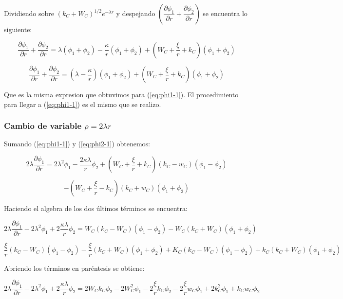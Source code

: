 \documentclass[a4paper, 12pt]{article} %
\begin{document}
Dividiendo sobre $(k_C + W_C)^{1/2}e^{-\lambda r}$ y despejando $\left( \dfrac{\partial \phi_1}{\partial r} 
+ \dfrac{\partial \phi_2}{\partial r} \right)$ se encuentra lo siguiente:

\[
\dfrac{\partial \phi_1}{\partial r} + \dfrac{\partial \phi_2}{\partial r} = \lambda (\phi_1 + \phi_2) - \dfrac{\kappa}{r}(\phi_1 + \phi_2)
+\left( W_C + \dfrac{\xi}{r} + k_C  \right)(\phi_1 + \phi_2) 
\]

\begin{equation}
\dfrac{\partial \phi_1}{\partial r} + \dfrac{\partial \phi_2}{\partial r} = \left ( \lambda - \dfrac{\kappa}{r} \right ) (\phi_1 + \phi_2)
+\left( W_C + \dfrac{\xi}{r} + k_C  \right)(\phi_1 + \phi_2) 
\end{equation}

Que es la misma expresion que obtuvimos para (\ref{eq:phi1-1}). El procedimiento para llegar a (\ref{eq:phi1-1}) es el mismo que se realizo.

 
\subsubsection{Cambio de variable $\rho=2\lambda r$} 

Sumando  (\ref{eq:phi1-1}) y  (\ref{eq:phi2-1}) obtenemos:

\[
2 \lambda \dfrac{\partial \phi_1}{\partial r} = 2 \lambda^2  \phi_1 
- \dfrac{2 \kappa \lambda }{r}\phi_2 + \left( W_C + \dfrac{\xi}{r} + k_C  \right ) 
(k_C - w_C)(\phi_1 - \phi_2) 
\]

\[
- \left( W_C + \dfrac{\xi}{r} - k_C  \right )(k_C + w_C)(\phi_1 + \phi_2) 
\]

Haciendo el algebra de los dos \'ultimos t\'erminos se encuentra:

\[
2 \lambda \dfrac{\partial \phi_1}{\partial r} -  2 \lambda^2  \phi_1 + 2\dfrac{\kappa \lambda}{r}\phi_2
= W_C(k_C - W_C)(\phi_1 - \phi_2) - W_C(k_C + W_C)(\phi_1 + \phi_2)
\]

\[
\dfrac{\xi}{r}(k_C - W_C)(\phi_1 - \phi_2) - \dfrac{\xi}{r}(k_C + W_C)(\phi_1 + \phi_2)
+ K_C (k_C - W_C)(\phi_1 - \phi_2) + k_C (k_C + W_C)(\phi_1 + \phi_2)
\]

Abriendo los t\'erminos en par\'entesis se obtiene:

\[
2 \lambda \dfrac{\partial \phi_1}{\partial r} -  2 \lambda^2  \phi_1 + 2\dfrac{\kappa \lambda}{r}\phi_2
= 2W_Ck_C\phi_2 - 2W_C^2 \phi_1 - 2 \dfrac{\xi}{r}k_C \phi_2 - 2 \dfrac{\xi}{r}w_C \phi_1 
+ 2 k_C^2 \phi_1  + k_C w_C \phi_2
\]
\end{document}
